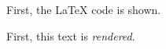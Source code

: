 \documentclass{article}
\begin{document}
\begin{example}[code-above=true]
  First, the \LaTeX{} code is shown.
\end{example}

\begin{example}[code-above=false]
  First, this text is \emph{rendered}.
\end{example}
\end{document}
